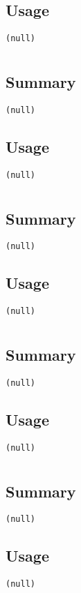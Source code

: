 \subsection{Usage}
\begin{verbatim}
(null)
\end{verbatim}


\section{}
\subsection{Summary}
\begin{verbatim}
(null)
\end{verbatim}
\subsection{Usage}
\begin{verbatim}
(null)
\end{verbatim}


\section{}
\subsection{Summary}
\begin{verbatim}
(null)
\end{verbatim}
\subsection{Usage}
\begin{verbatim}
(null)
\end{verbatim}


\section{}
\subsection{Summary}
\begin{verbatim}
(null)
\end{verbatim}
\subsection{Usage}
\begin{verbatim}
(null)
\end{verbatim}


\section{}
\subsection{Summary}
\begin{verbatim}
(null)
\end{verbatim}
\subsection{Usage}
\begin{verbatim}
(null)
\end{verbatim}


